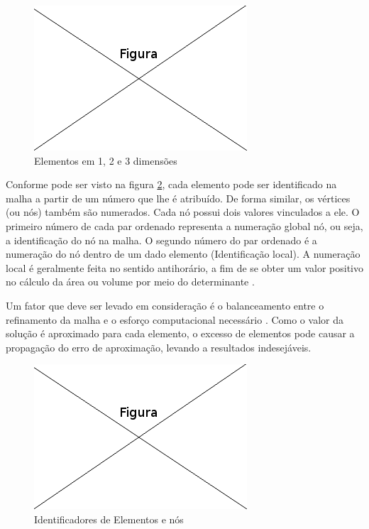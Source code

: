 \documentclass[
    12pt,               %
    openright,          %
    oneside,
    a4paper,            %
    english,            %
    french,             %
    spanish,            %
    brazil              %
    ]{abntex2}
\begin{document}
\begin{figure}[!htb]
\centering
\includegraphics[scale=0.5]{figuras/temp.png}
\caption{Elementos em 1, 2 e 3 dimensões}
\label{fig:elementos}
\end{figure}

Conforme pode ser visto na figura \ref{fig:numeracao}, cada elemento pode ser identificado na malha a partir de um número que lhe é atribuído. De forma similar, os vértices (ou nós) também são numerados. Cada nó possui dois valores vinculados a ele. 
O primeiro número de cada par ordenado representa a numeração global nó, ou seja, a identificação do nó na malha. O segundo número do par ordenado é a numeração do nó dentro de um dado elemento (Identificação local). A numeração local é geralmente feita no sentido antihorário, a fim de se obter um valor positivo no cálculo da área ou volume por meio do  determinante \cite[p. 394]{sadiku} \cite[p. 95]{jin}. 

Um fator que deve ser levado em consideração é o balanceamento entre o refinamento da malha e o esforço computacional necessário \cite[p. 154]{desai}. Como o valor da solução é aproximado para cada elemento, o excesso de elementos pode causar a propagação do erro de aproximação, levando a resultados indesejáveis.


\begin{figure}[!htb]
\centering
\includegraphics[scale=0.5]{figuras/temp.png}
\caption{Identificadores de Elementos e nós}
\label{fig:numeracao}
\end{figure}
\end{document}
